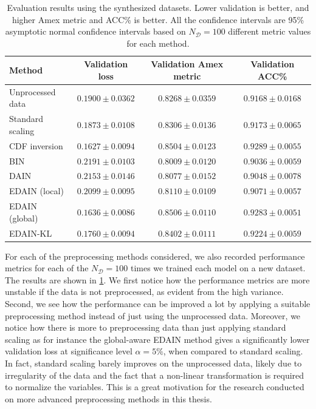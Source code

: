 \documentclass{statsmsc}
\begin{document}
{%
\begin{table}[htp]
    \centering
    \begin{tabular}{l|ccc}
        \toprule
        Method        & Validation loss &     Validation Amex metric &            Validation ACC\% \\
        \midrule
        Unprocessed data           & $0.1900 \pm 0.0362$ & $0.8268 \pm 0.0359$ & $0.9168 \pm 0.0168$  \\
        Standard scaling      & $0.1873 \pm 0.0108$ & $0.8306 \pm 0.0136$ & $0.9173 \pm 0.0065$  \\
        \ac{CDF} inversion  & $\mathbf{ 0.1627 \pm 0.0094}$ & $0.8504 \pm 0.0123$ & $\mathbf{0.9289 \pm 0.0055}$  \\
        BIN           & $0.2191 \pm 0.0103$ & $0.8009 \pm 0.0120$ & $0.9036 \pm 0.0059$  \\
        DAIN          & $0.2153 \pm 0.0146$ & $0.8077 \pm 0.0152$ & $0.9048 \pm 0.0078$  \\
        EDAIN (local)  & $0.2099 \pm 0.0095$ & $0.8110 \pm 0.0109$ & $0.9071 \pm 0.0057$  \\
        EDAIN (global) & $0.1636 \pm 0.0086$ & $\mathbf{0.8506 \pm 0.0110}$ & $0.9283 \pm 0.0051$  \\
        EDAIN-KL      & $0.1760 \pm 0.0094$ & $0.8402 \pm 0.0111$ & $0.9224 \pm 0.0059$  \\
        \bottomrule
    \end{tabular}%
    \caption{
        Evaluation results using the synthesized datasets. Lower validation is better, and
        higher Amex metric and ACC\% is better. All the confidence intervals are 95\% asymptotic
        normal confidence intervals based on $N_{\mathcal{D}}=100$ different metric values for
        each method.
    }%
    \label{tab:synth_results}
\end{table}

For each of the preprocessing methods considered, we also recorded performance metrics for each
of the $N_{\mathcal{D}}=100$ times we trained each model on a new dataset. The results are
shown in \cref{tab:synth_results}. We first notice how the performance metrics are more unstable
if the data is not preprocessed, as evident from the high variance. Second, we see how the
performance can be improved a lot by applying a suitable preprocessing method instead of just
using the unprocessed data. Moreover, we notice how there is more to preprocessing data than just
applying standard scaling as for instance the global-aware \ac{EDAIN} method
gives a significantly lower validation loss at significance level $\alpha=5\%$, when
compared to standard scaling. In fact, standard scaling barely improves on the unprocessed data,
likely due to irregularity of the data and the fact that a non-linear transformation is required
to normalize the variables.  This is a great motivation for the research conducted on more advanced
preprocessing methods in this thesis.

}
\end{document}
